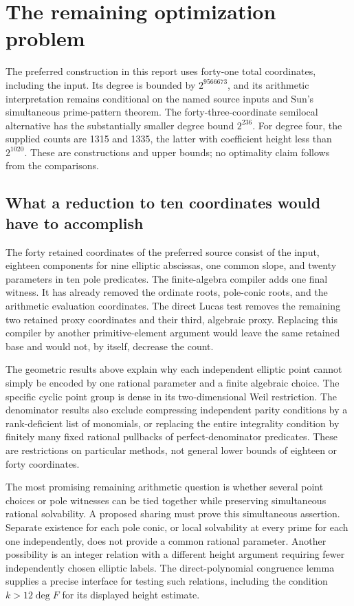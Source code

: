 \section{The remaining optimization problem}
\label{sec:strategy}

The preferred construction in this report uses forty-one total
coordinates, including the input. Its degree is bounded by
$2^{9566673}$, and its arithmetic interpretation remains conditional
on the named source inputs and Sun's simultaneous prime-pattern theorem.
The forty-three-coordinate semilocal alternative has the substantially
smaller degree bound $2^{236}$. For degree four, the supplied counts
are 1315 and 1335, the latter with coefficient height less than
$2^{1020}$. These are constructions and upper bounds; no optimality
claim follows from the comparisons.

\subsection{What a reduction to ten coordinates would have to accomplish}

The forty retained coordinates of the preferred source consist of the
input, eighteen components for nine elliptic abscissas, one common
slope, and twenty parameters in ten pole predicates. The finite-algebra
compiler adds one final witness. It has already removed the ordinate
roots, pole-conic roots, and the arithmetic evaluation coordinates.
The direct Lucas test removes the remaining two retained proxy
coordinates and their third, algebraic proxy. Replacing this compiler
by another primitive-element argument would leave the same retained
base and would not, by itself, decrease the count.

The geometric results above explain why each independent elliptic
point cannot simply be encoded by one rational parameter and a finite
algebraic choice. The specific cyclic point group is dense in its
two-dimensional Weil restriction. The denominator results also exclude
compressing independent parity conditions by a rank-deficient list of
monomials, or replacing the entire integrality condition by finitely
many fixed rational pullbacks of perfect-denominator predicates.
These are restrictions on particular methods, not general lower bounds
of eighteen or forty coordinates.

The most promising remaining arithmetic question is whether several
point choices or pole witnesses can be tied together while preserving
simultaneous rational solvability. A proposed sharing must prove this
simultaneous assertion. Separate existence for each pole conic, or
local solvability at every prime for each one independently, does not
provide a common rational parameter. Another possibility is an integer
relation with a different height argument requiring fewer independently
chosen elliptic labels. The direct-polynomial congruence lemma supplies
a precise interface for testing such relations, including the condition
$k>12\deg F$ for its displayed height estimate.

